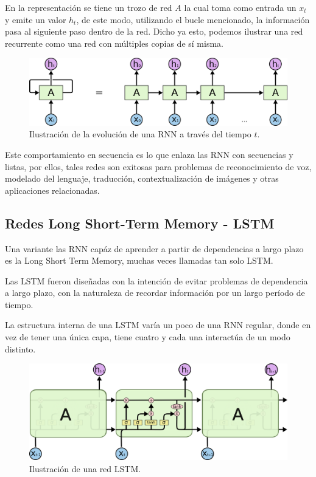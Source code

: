 \documentclass[12pt, letterpaper]{article}
\begin{document}
    En la representación se tiene un trozo de red $A$ la cual toma como entrada un $x_t$ y emite un valor $h_t$, de este modo, utilizando el bucle mencionado, la información pasa al siguiente paso dentro de la red. Dicho ya esto, podemos ilustrar una red recurrente como una red con múltiples copias de sí misma\cite{Understanding_LSTM}.

    \begin{figure}[H]
        \centering
        \includegraphics[width=\linewidth]{img/RNN-unrolled.png}
        \caption{Ilustración de la evolución de una RNN a través del tiempo $t$.}
    \end{figure}
    
    Este comportamiento en secuencia es lo que enlaza las RNN con secuencias y listas, por ellos, tales redes son exitosas para problemas de reconocimiento de voz, modelado del lenguaje, traducción, contextualización de imágenes y otras aplicaciones relacionadas\cite{rnn-effectiveness}.

    \subsection{Redes Long Short-Term Memory - LSTM}
    Una variante las RNN capáz de aprender a partir de dependencias a largo plazo es la Long Short Term Memory, muchas veces llamadas tan solo LSTM.
    
    Las LSTM fueron diseñadas con la intención de evitar problemas de dependencia a largo plazo, con la naturaleza de recordar información por un largo período de tiempo.
    
    La estructura interna de una LSTM varía un poco de una RNN regular, donde en vez de tener una única capa, tiene cuatro y cada una interactúa de un modo distinto.

        \begin{figure}[H]
            \centering
            \includegraphics[width=0.8\linewidth]{img/LSTM3-chain.png}
            \caption{Ilustración de una red LSTM.}
        \end{figure}
\end{document}
